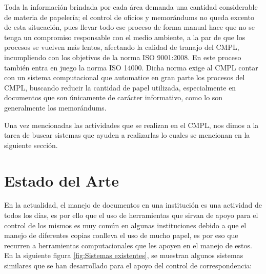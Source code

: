 	Toda la información brindada por cada área demanda una cantidad considerable de materia de papelería; el control de oficios y memorándums no queda excento de esta situcación, pues llevar todo ese proceso de forma manual hace que no se tenga un compromiso responsable con el medio ambiente, a la par de que los procesos se vuelven más lentos, afectando la calidad de tranajo del CMPL, incumpliendo con los objetivos de la norma ISO 9001:2008.  En este proceso también entra en juego la norma ISO 14000. Dicha norma exige al CMPL contar con un sistema computacional que automatice en gran parte los procesos del CMPL, buscando reducir la cantidad de papel utilizada, especialmente en documentos que son únicamente de carácter informativo, como lo son generalmente los memorándums. 
	
	Una vez mencionadas las actividades que se realizan en el CMPL, nos dimos a la tarea de buscar sistemas que ayuden a realizarlas lo cuales se mencionan en la siguiente sección.\\
	
	\section{Estado del Arte}
	
	En la actualidad, el manejo de documentos en una institución es una actividad de todos los días, es por ello que el uso de herramientas que sirvan de apoyo para el control de los mismos es muy común en algunas instituciones debido a que el manejo de diferentes copias conlleva el uso de mucho papel, es por eso que recurren a herramientas computacionales que les apoyen en el manejo de estos. \\
	

En la siguiente figura \ref{fig:Sistemas existentes}, se muestran algunos sistemas similares que se han desarrollado para el apoyo del control de correspondencia:\\

